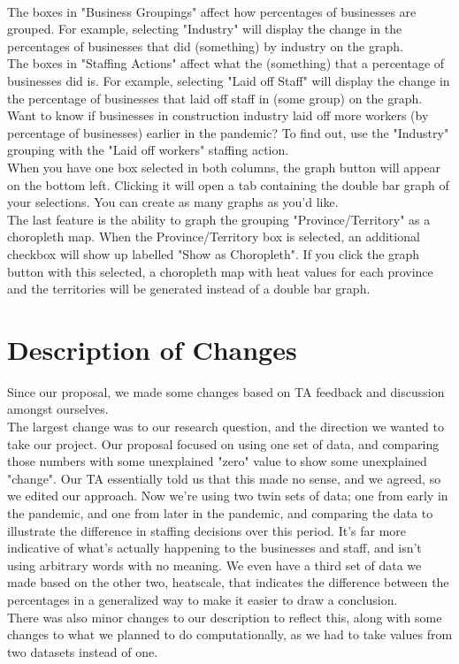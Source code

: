 \documentclass[fontsize=11pt]{article}
\begin{document}
    \\
    The boxes in "Business Groupings" affect how percentages of businesses are grouped. For example, selecting "Industry" will display the change in the percentages of businesses that did (something) by industry on the graph.
    \\
    The boxes in "Staffing Actions" affect what the (something) that a percentage of businesses did is. For example, selecting "Laid off Staff" will display the change in the percentage of businesses that laid off staff in (some group) on the graph.
    \\
    Want to know if businesses in construction industry laid off more workers (by percentage of businesses) earlier in the pandemic? To find out, use the "Industry" grouping with the "Laid off workers" staffing action.
    \\
    When you have one box selected in both columns, the graph button will appear on the bottom left. Clicking it will open a tab containing the double bar graph of your selections. You can create as many graphs as you'd like.
    \\
    The last feature is the ability to graph the grouping "Province/Territory" as a choropleth map. When the Province/Territory box is selected, an additional checkbox will show up labelled "Show as Choropleth". If you click the graph button with this selected, a choropleth map with heat values for each province and the territories will be generated instead of a double bar graph.


    \section*{Description of Changes}

    Since our proposal, we made some changes based on TA feedback and discussion amongst ourselves.
    \\
    The largest change was to our research question, and the direction we wanted to take our project. Our proposal focused on using one set of data, and comparing those numbers with some unexplained "zero" value to show some unexplained "change". Our TA essentially told us that this made no sense, and we agreed, so we edited our approach. Now we're using two twin sets of data; one from early in the pandemic, and one from later in the pandemic, and comparing the data to illustrate the difference in staffing decisions over this period. It's far more indicative of what's actually happening to the businesses and staff, and isn't using arbitrary words with no meaning. We even have a third set of data we made based on the other two, heatscale, that indicates the difference between the percentages in a generalized way to make it easier to draw a conclusion.
    \\
    There was also minor changes to our description to reflect this, along with some changes to what we planned to do computationally, as we had to take values from two datasets instead of one.
\end{document}
